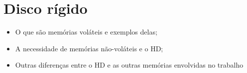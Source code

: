 \section{Disco rígido}

    \begin{itemize}
        \item O que são memórias voláteis e exemplos delas;
        \item A necessidade de memórias não-voláteis e o HD;
        \item Outras diferenças entre o HD e as outras memórias 
        envolvidas no trabalho
    \end{itemize}